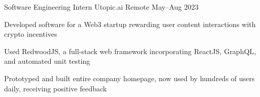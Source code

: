 \experience
{Software Engineering Intern}
{Utopic.ai}
{Remote}
{May--Aug 2023}
{
	\item Developed software for a Web3 startup rewarding user content interactions with crypto incentives
	\item Used RedwoodJS, a full-stack web framework incorporating ReactJS, GraphQL, and automated unit testing
	\item Prototyped and built entire company homepage, now used by hundreds of users daily, receiving positive feedback	
}
